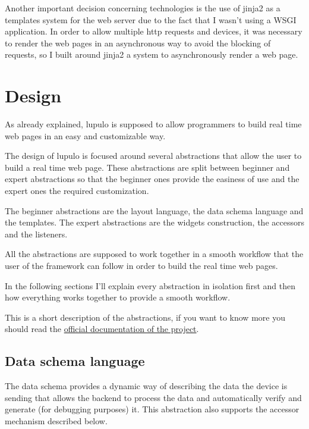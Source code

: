 \documentclass[12pt]{article}
\begin{document}
            Another important decision concerning technologies is the use of
            jinja2 as a templates system for the web server due to the fact that
            I wasn't using a WSGI application. In order to allow multiple http
            requests and devices, it was necessary to render the web pages in an
            asynchronous way to avoid the blocking of requests, so I built
            around jinja2 a system to asynchronously render a web page.
    \section{Design}
        As already explained, lupulo is supposed to allow programmers to build
        real time web pages in an easy and customizable way.

        The design of lupulo is focused around several abstractions that allow
        the user to build a real time web page. These abstractions are split
        between beginner and expert abstractions so that the beginner ones
        provide the easiness of use and the expert ones the required
        customization.
        
        The beginner abstractions are the layout language, the data schema
        language and the templates. The expert abstractions are the widgets
        construction, the accessors and the listeners.

        All the abstractions are supposed to work together in a smooth workflow
        that the user of the framework can follow in order to build the real
        time web pages.

        In the following sections I'll explain every abstraction in isolation
        first and then how everything works together to provide a smooth
        workflow.

        This is a short description of the abstractions, if you want to know
        more you should read the
        \href{http://lupulo.readthedocs.org/en/latest/index.html}{official
        documentation of the project}.

        \subsection{Data schema language}
            The data schema provides a dynamic way of describing the data the
            device is sending that allows the backend to process the data and
            automatically verify and generate (for debugging purposes) it. This
            abstraction also supports the accessor mechanism described below.
\end{document}
